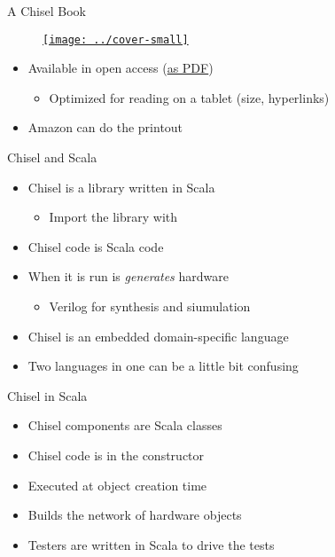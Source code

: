 \begin{frame}[fragile]{A Chisel Book}
\begin{figure}
    \centering
    \href{https://github.com/schoeberl/chisel-book}{\texttt{[image: ../cover-small]}}
\end{figure}

\begin{itemize}
\item Available in open access (\href{https://www.imm.dtu.dk/~masca/chisel-book.pdf}{as PDF})
\begin{itemize}
\item Optimized for reading on a tablet (size, hyperlinks)
\end{itemize}
\item Amazon can do the printout
\end{itemize}
\end{frame}



\begin{frame}[fragile]{Chisel and Scala}
\begin{itemize}
\item Chisel is a library written in Scala
\begin{itemize}
\item Import the library with 
\end{itemize}
\item Chisel code is Scala code
\item When it is run is \emph{generates} hardware
\begin{itemize}
\item Verilog for synthesis and siumulation
\end{itemize}
\item Chisel is an embedded domain-specific language
\item Two languages in one can be a little bit confusing
\end{itemize}
\end{frame}

\begin{frame}[fragile]{Chisel in Scala}
\begin{itemize}
\item Chisel components are Scala classes
\item Chisel code is in the constructor
\item Executed at object creation time
\item Builds the network of hardware objects
\item Testers are written in Scala to drive the tests
\end{itemize}
\end{frame}


